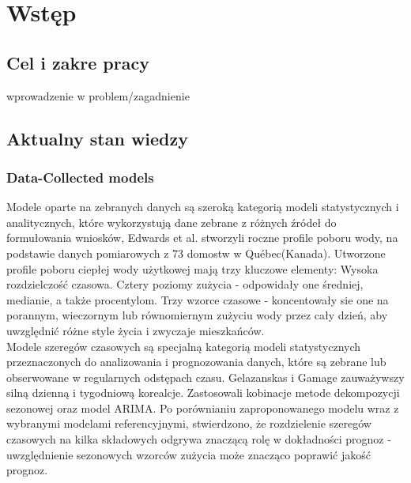 \documentclass[a4paper,twoside,12pt]{book}
\newcounter{stronyPozaNumeracja}
\begin{document}
\tableofcontents

\setcounter{stronyPozaNumeracja}{\value{page}}
\mainmatter
\pagestyle{empty}

\cleardoublepage

\pagestyle{NumeryStronNazwyRozdzialow}


\chapter{Wstęp}
\label{ch:wstep}
\section{Cel i zakre pracy}
wprowadzenie w problem/zagadnienie
\newpage
\section{Aktualny stan wiedzy}

\subsection{Data-Collected models}
Modele oparte na zebranych danych są szeroką kategorią modeli statystycznych i analitycznych, które wykorzystują dane zebrane z różnych źródeł do formułowania wniosków, Edwards et al.\cite{bib:data_model} stworzyli roczne profile poboru wody, na podstawie danych pomiarowych z 73 domostw w Québec(Kanada). Utworzone profile poboru ciepłej wody użytkowej mają trzy kluczowe elementy: Wysoka rozdzielczość czasowa. Cztery poziomy zużycia - odpowidały one średniej, medianie, a także procentylom. Trzy wzorce czasowe - koncentowały sie one na porannym, wieczornym lub równomiernym zużyciu wody przez cały dzień, aby uwzględnić różne style życia i zwyczaje mieszkańców.\\

Modele szeregów czasowych są specjalną kategorią modeli statystycznych przeznaczonych do analizowania i prognozowania danych, które są zebrane lub obserwowane w regularnych odstępach czasu. Gelazanskas i Gamage\cite{bib:Time_series} zauważywszy silną dzienną i tygodniową korealcje. Zastosowali kobinacje metode dekompozycji sezonowej oraz model ARIMA. Po porównianiu zaproponowanego modelu wraz z wybranymi modelami referencyjnymi, stwierdzono, że rozdzielenie szeregów czasowych na kilka składowych odgrywa znaczącą rolę w dokładności prognoz - uwzględnienie sezonowych wzorców zużycia może znacząco poprawić jakość prognoz.\\
\end{document}

